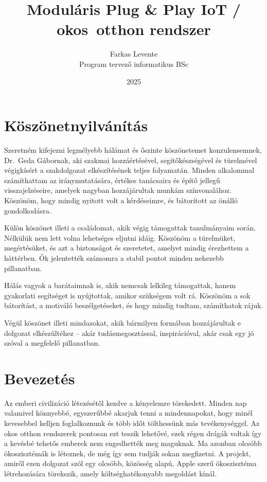 \documentclass{thesis-ekf}
\theoremstyle{definition}
\theoremstyle{remark}
\begin{document}
	
	\title{Moduláris Plug \& Play IoT / okos~otthon rendszer}
	\author{Farkas Levente\\Program tervező informatikus BSc}
	\date{2025}
	\maketitle
	\chapter*{Köszönetnyilvánítás}
	Szeretném kifejezni legmélyebb hálámat és őszinte köszönetemet konzulensemnek,\\ Dr.~Geda Gábornak, aki szakmai hozzáértésével, segítőkészségével és türelmével végigkísért a szakdolgozat elkészítésének teljes folyamatán. Minden alkalommal számíthattam az iránymutatására, értékes tanácsaira és építő jellegű visszajelzéseire, amelyek nagyban hozzájárultak munkám színvonalához. Köszönöm, hogy mindig nyitott volt a kérdéseimre, és bátorított az önálló gondolkodásra.
	
	Külön köszönet illeti a családomat, akik végig támogattak tanulmányaim során. Nélkülük nem lett volna lehetséges eljutni idáig. Köszönöm a türelmüket, megértésüket, és azt a biztonságot és szeretetet, amelyet mindig érezhettem a háttérben. Ők jelentették számomra a stabil pontot minden nehezebb pillanatban.
	
	Hálás vagyok a barátaimnak is, akik nemcsak lelkileg támogattak, hanem gyakorlati segítséget is nyújtottak, amikor szükségem volt rá. Köszönöm a sok bátorítást, a motiváló beszélgetéseket, és hogy mindig tudtam, számíthatok rájuk.
	
	Végül köszönet illeti mindazokat, akik bármilyen formában hozzájárultak e dolgozat elkészültéhez – akár tudásmegosztással, inspirációval, akár csak egy jó szóval a megfelelő pillanatban.
	
	\tableofcontents
	\chapter*{Bevezetés}
	
	Az emberi civilizáció létezésétől kezdve a kényelemre törekedett. Minden nap valamivel könnyebbé, egyszerűbbé akarjuk tenni a mindennapokat, hogy minél kevesebbel kelljen foglalkoznunk és több időt tölthessünk más tevékenységgel. Az okos otthon rendszerek pontosan ezt teszik lehetővé, ezek régen drágák voltak így  a kevésbé tehetős emberek nem engedhették meg maguknak. Ma azonban olcsóbb ökoszisztémák is léteznek, de még így sem tudják sokan megfizetni. A projekt, amiről ezen dolgozat szól egy olcsóbb, közösség alapú, Apple szerű ökoszisztéma létrehozására törekszik, amely költséghatékonyabb megoldást kínál.
	
\end{document}
